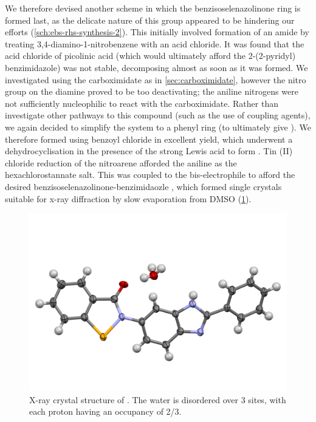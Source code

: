 \begin{refsection}
We therefore devised another scheme in which the benzisoselenazolinone ring is formed last, as the delicate nature of this group appeared to be hindering our efforts (\cref{sch:ebs-rhs-synthesis-2}).
This initially involved formation of an amide  by treating 3,4-diamino-1-nitrobenzene with an acid chloride.
It was found that the acid chloride of picolinic acid (which would ultimately afford the 2-(2-pyridyl) benzimidazole) was not stable, decomposing almost as soon as it was formed.
We investigated using the carboximidate as in \cref{sec:carboximidate}, however the nitro group on the diamine proved to be too deactivating; the aniline nitrogens were not sufficiently nucleophilic to react with the carboximidate.
Rather than investigate other pathways to this compound (such as the use of coupling agents), we again decided to simplify the system to a phenyl ring (to ultimately give ).
We therefore formed  using benzoyl chloride in excellent yield, which underwent a dehydrocyclisation in the presence of the strong Lewis acid  to form .
Tin (II) chloride reduction of the nitroarene  afforded the aniline  as the hexachlorostannate salt.
This was coupled to the bis-electrophile  to afford the desired benzisoselenazolinone-benzimidaozle , which formed single crystals suitable for x-ray diffraction by slow evaporation from DMSO (\cref{fig:ebs-rhs-xray}).

\begin{figure}[ht]
    \centering
    \includegraphics[width=0.8\linewidth]{Figures/ebs-rhs-xray.pdf}
    \caption[X-ray crystal structure of .]{X-ray crystal structure of . The water is disordered over 3 sites, with each proton having an occupancy of 2/3.}
    \label{fig:ebs-rhs-xray}
\end{figure}


\end{refsection}
